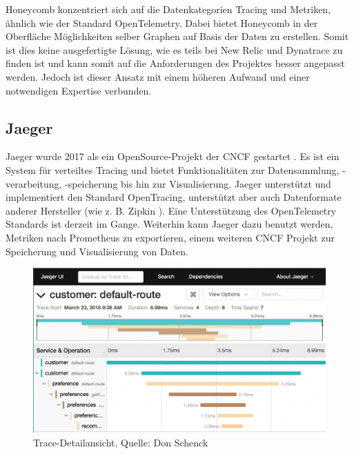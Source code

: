 Honeycomb konzentriert sich auf die Datenkategorien Tracing und Metriken, ähnlich wie der Standard OpenTelemetry. Dabei bietet Honeycomb in der Oberfläche Möglichkeiten selber Graphen auf Basis der Daten zu erstellen. Somit ist dies keine ausgefertigte Lösung, wie es teils bei New Relic und Dynatrace zu finden ist und kann somit auf die Anforderungen des Projektes besser angepasst werden. Jedoch ist dieser Ansatz mit einem höheren Aufwand und einer notwendigen Expertise verbunden.

\subsection{Jaeger}

Jaeger wurde 2017 als ein OpenSource-Projekt der CNCF gestartet \cite{Jaeger}. Es ist ein System für verteiltes Tracing und bietet Funktionalitäten zur Datensammlung, -verarbeitung, -speicherung bis hin zur Visualisierung. Jaeger unterstützt und implementiert den Standard OpenTracing, unterstützt aber auch Datenformate anderer Hersteller (wie z. B. Zipkin \cite{Zipkin}). Eine Unterstützung des OpenTelemetry Standards ist derzeit im Gange. Weiterhin kann Jaeger dazu benutzt werden, Metriken nach Prometheus \cite{Prometheus} zu exportieren, einem weiteren CNCF Projekt zur Speicherung und Visualisierung von Daten.

\begin{figure}
\centering
\includegraphics[width=\linewidth]{img/03_methoden/redhat_jaeger-ui_trace-detail-view.png}
\caption{Trace-Detailansicht. Quelle: Don Schenck \cite{JaegerIstioTracing}}
\label{fig:jaeger-ui_trace-detail-view}
\end{figure}

